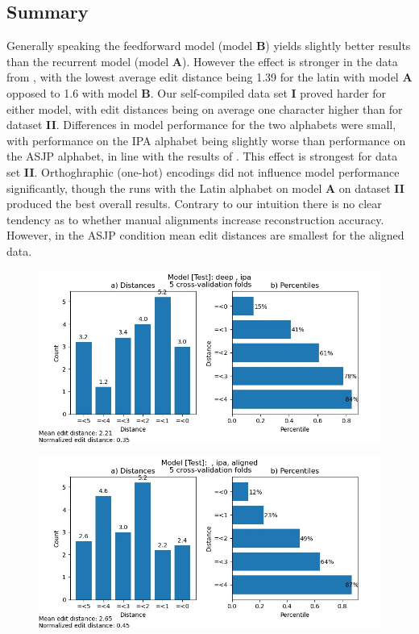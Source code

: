 \subsection{Summary}

Generally speaking the feedforward model (model \textbf{B}) yields slightly better results than the recurrent model (model \textbf{A}). However the effect is stronger in the data from \citet{ciobanu-dinu-2014-automatic}, with the lowest average edit distance being 1.39 for the latin with model \textbf{A} opposed to 1.6 with model \textbf{B}. Our self-compiled data set \textbf{I} proved harder for either model, with edit distances being on average one character higher than for dataset \textbf{II}.
Differences in model performance for the two alphabets were small, with performance on the IPA alphabet being slightly worse than performance on the ASJP alphabet, in line with the results of \citet{meloni2019ab}. This effect is strongest for data set \textbf{II}. Orthoghraphic (one-hot) encodings did not influence model performance significantly, though the runs with the Latin alphabet on model \textbf{A} on dataset \textbf{II} produced the best overall results. 
Contrary to our intuition there is no clear tendency as to whether manual alignments increase reconstruction accuracy. However, in the ASJP condition mean edit distances are smallest for the aligned data.

\begin{figure}
    \centering
    \includegraphics[width=\textwidth]{deep_test_ipa.jpg}
    \label{fig:sdti}
\end{figure}

\begin{figure}
    \centering
    \includegraphics[width=\textwidth]{deep_test_ipa_aligned.jpg}
    \label{fig:sdtia}
\end{figure}

